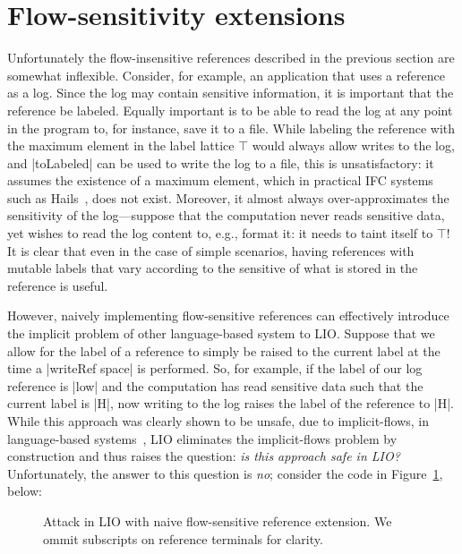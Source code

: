 \section{Flow-sensitivity extensions}
\label{sec:flow-sensitive}

Unfortunately the flow-insensitive references described in the previous section
are somewhat inflexible.
%
Consider, for example, an application that uses a reference as a log.
%
Since the log may contain sensitive information, it is important that the
reference be labeled.
%
Equally important is to be able to read the log at any point in the program to,
for instance, save it to a file.
%
While labeling the reference with the maximum element in the label lattice
$\top$ would always allow writes to the log, and |toLabeled| can be used to
write the log to a file, this is unsatisfactory: it assumes the existence of a
maximum element, which in practical IFC systems such as Hails~\tocite{}, does
not exist.
%
Moreover, it almost always over-approximates the sensitivity of the
log---suppose that the computation never reads sensitive data, yet wishes to
read the log content to, e.g., format it: it needs to taint itself to $\top$!
%
It is clear that even in the case of simple scenarios, having references with
mutable labels that vary according to the sensitive of what is stored in the
reference is useful.

However, naively implementing flow-sensitive references can effectively
introduce the implicit problem of other language-based system to LIO.
%
Suppose that we allow for the label of a reference to simply be raised to the
current label at the time a |writeRef space| is performed.
%
So, for example, if the label of our log reference is |low| and the computation
has read sensitive data such that the current label is |H|, now writing to the
log raises the label of the reference to |H|.
%
While this approach was clearly shown to be unsafe, due to implicit-flows, in
language-based systems~\tocite{}, LIO eliminates the implicit-flows problem by
construction and thus raises the question: \emph{is this approach safe in LIO?}
%
Unfortunately, the answer to this question is \emph{no}; consider the code
in Figure~\ref{fig:fs-attack}, below:
%
\begin{figure}[h!]
\small
{}
\cut{$}
\caption{Attack in LIO with naive flow-sensitive reference extension. We ommit
subscripts on reference terminals for clarity.  \label{fig:fs-attack}}
\end{figure}

